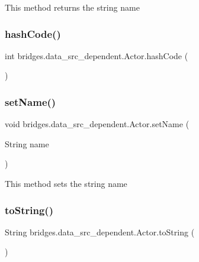 This method returns the string name \hypertarget{classbridges_1_1data__src__dependent_1_1_actor_a78e29e54c8a200ddbcbae2e0eb323722}{}\label{classbridges_1_1data__src__dependent_1_1_actor_a78e29e54c8a200ddbcbae2e0eb323722} 
\subsubsection{\texorpdfstring{hash\+Code()}{hashCode()}}
{\footnotesize\ttfamily int bridges.\+data\+\_\+src\+\_\+dependent.\+Actor.\+hash\+Code (\begin{DoxyParamCaption}{ }\end{DoxyParamCaption})}

\hypertarget{classbridges_1_1data__src__dependent_1_1_actor_a8a3650b446402d511bb4fe99827ff90a}{}\label{classbridges_1_1data__src__dependent_1_1_actor_a8a3650b446402d511bb4fe99827ff90a} 
\subsubsection{\texorpdfstring{set\+Name()}{setName()}}
{\footnotesize\ttfamily void bridges.\+data\+\_\+src\+\_\+dependent.\+Actor.\+set\+Name (\begin{DoxyParamCaption}\item[{String}]{name }\end{DoxyParamCaption})}

This method sets the string name \hypertarget{classbridges_1_1data__src__dependent_1_1_actor_a5210a5b38a4a311b92e7332aeddb65ff}{}\label{classbridges_1_1data__src__dependent_1_1_actor_a5210a5b38a4a311b92e7332aeddb65ff} 
\subsubsection{\texorpdfstring{to\+String()}{toString()}}
{\footnotesize\ttfamily String bridges.\+data\+\_\+src\+\_\+dependent.\+Actor.\+to\+String (\begin{DoxyParamCaption}{ }\end{DoxyParamCaption})}

